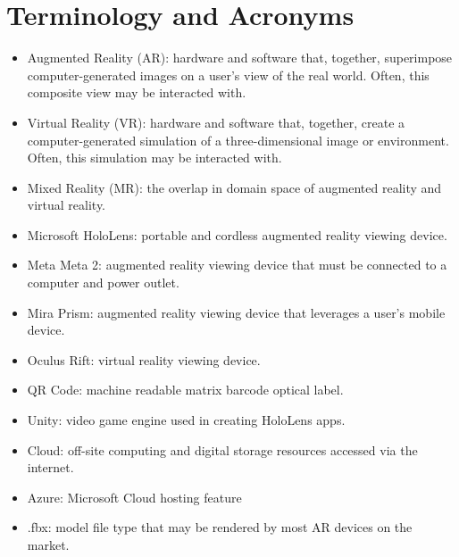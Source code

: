 \section{Terminology and Acronyms}

\begin{itemize}
	\item Augmented Reality (AR): hardware and software that, together, superimpose computer-generated images on a user's view of the real world. Often, this composite view may be interacted with. 

	\item Virtual Reality (VR): hardware and software that, together, create a computer-generated simulation of a three-dimensional image or environment. Often, this simulation may be interacted with. 

	\item Mixed Reality (MR): the overlap in domain space of augmented reality and virtual reality. 

	\item Microsoft HoloLens: portable and cordless augmented reality viewing device. 

	\item Meta Meta 2: augmented reality viewing device that must be connected to a computer and power outlet. 

	\item Mira Prism: augmented reality viewing device that leverages a user's mobile device.

	\item Oculus Rift: virtual reality viewing device. 

    \item QR Code: machine readable matrix barcode optical label.
    
    \item Unity: video game engine used in creating HoloLens apps.

	\item Cloud: off-site computing and digital storage resources accessed via the internet. 

    \item Azure: Microsoft Cloud hosting feature

	\item .fbx: model file type that may be rendered by most AR devices on the market. 
\end{itemize}


